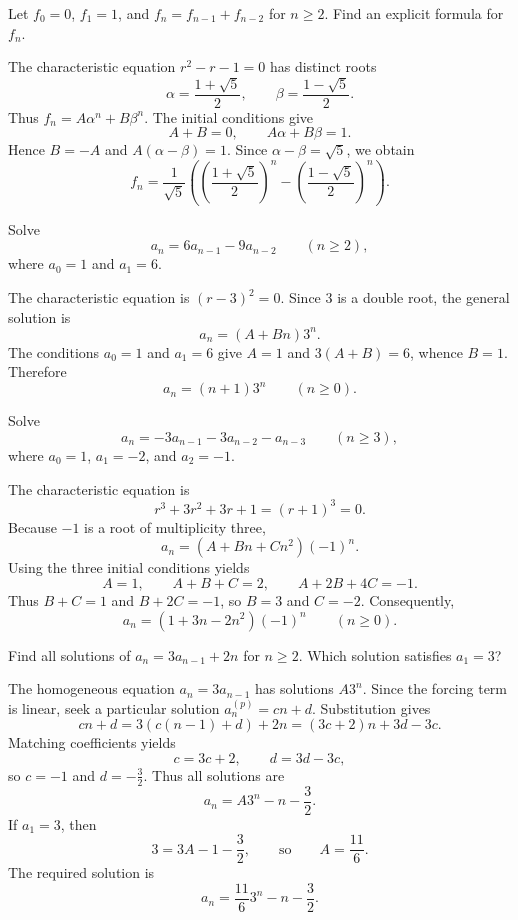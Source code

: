 \documentclass[11pt, oneside]{article}
\begin{document}
\begin{problem}
Let $f_0=0$, $f_1=1$, and $f_n=f_{n-1}+f_{n-2}$ for $n\ge2$.
Find an explicit formula for $f_n$.
\end{problem}
\begin{solution}
The characteristic equation $r^2-r-1=0$ has distinct roots
\[
\alpha=\frac{1+\sqrt5}{2}, \qquad
\beta=\frac{1-\sqrt5}{2}.
\]
Thus $f_n=A\alpha^n+B\beta^n$. The initial conditions give
\[
A+B=0, \qquad A\alpha+B\beta=1.
\]
Hence $B=-A$ and $A(\alpha-\beta)=1$. Since
$\alpha-\beta=\sqrt5$, we obtain
\[
\boxed{f_n=\frac1{\sqrt5}
\left(\left(\frac{1+\sqrt5}{2}\right)^n
-\left(\frac{1-\sqrt5}{2}\right)^n\right).}
\]
\end{solution}

\begin{problem}
Solve
\[
a_n=6a_{n-1}-9a_{n-2}\qquad(n\ge2),
\]
where $a_0=1$ and $a_1=6$.
\end{problem}
\begin{solution}
The characteristic equation is $(r-3)^2=0$. Since $3$ is a
double root, the general solution is
\[
a_n=(A+Bn)3^n.
\]
The conditions $a_0=1$ and $a_1=6$ give
$A=1$ and $3(A+B)=6$, whence $B=1$. Therefore
\[
\boxed{a_n=(n+1)3^n\qquad(n\ge0).}
\]
\end{solution}

\begin{problem}
Solve
\[
a_n=-3a_{n-1}-3a_{n-2}-a_{n-3}\qquad(n\ge3),
\]
where $a_0=1$, $a_1=-2$, and $a_2=-1$.
\end{problem}
\begin{solution}
The characteristic equation is
\[
r^3+3r^2+3r+1=(r+1)^3=0.
\]
Because $-1$ is a root of multiplicity three,
\[
a_n=(A+Bn+Cn^2)(-1)^n.
\]
Using the three initial conditions yields
\[
A=1, \qquad A+B+C=2, \qquad A+2B+4C=-1.
\]
Thus $B+C=1$ and $B+2C=-1$, so $B=3$ and $C=-2$.
Consequently,
\[
\boxed{a_n=(1+3n-2n^2)(-1)^n\qquad(n\ge0).}
\]
\end{solution}

\begin{problem}
Find all solutions of $a_n=3a_{n-1}+2n$ for $n\ge2$.
Which solution satisfies $a_1=3$?
\end{problem}
\begin{solution}
The homogeneous equation $a_n=3a_{n-1}$ has solutions $A3^n$.
Since the forcing term is linear, seek a particular solution
$a_n^{(p)}=cn+d$. Substitution gives
\[
cn+d=3(c(n-1)+d)+2n=(3c+2)n+3d-3c.
\]
Matching coefficients yields
\[
c=3c+2, \qquad d=3d-3c,
\]
so $c=-1$ and $d=-\frac32$. Thus all solutions are
\[
a_n=A3^n-n-\frac32.
\]
If $a_1=3$, then
\[
3=3A-1-\frac32,
\qquad\text{so}\qquad A=\frac{11}{6}.
\]
The required solution is
\[
\boxed{a_n=\frac{11}{6}3^n-n-\frac32.}
\]
\end{solution}
\end{document}
